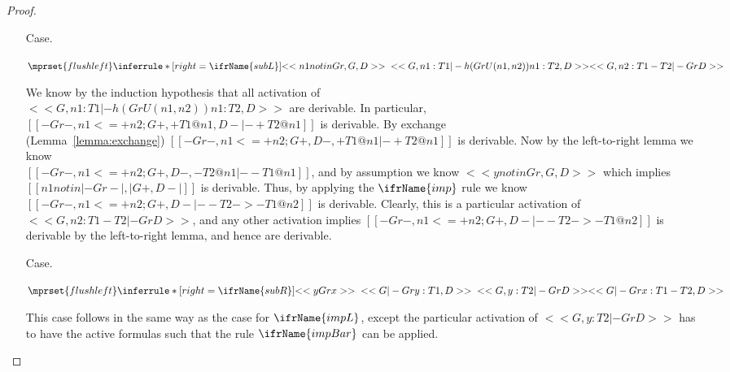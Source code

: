 \begin{proof}
\begin{itemize}
  \item[Case.]\ \\ 
    \begin{center}
      \begin{math}
        $$\mprset{flushleft}
        \inferrule* [right=\ifrName{subL}] {
          <<n1 notin Gr, G, D>>
          \\\\
          <<G, n1 : T1 |- h(Gr U {(n1,n2)}) n1 : T2, D>>
        }{<<G, n2 : T1 - T2 |- Gr D>>}
      \end{math}
    \end{center}
    We know by the induction hypothesis
    that all activation of \\ $<<G, n1 : T1 |- h(Gr U {(n1,n2)}) n1 : T2, D>>$ are derivable.  In particular,
    $[[-Gr-,n1 <=+ n2 ; {G}+, +{T1}@n1,{D}- |- +{T2}@n1]]$ is
    derivable.  By exchange \\ (Lemma~\ref{lemma:exchange})
    $[[-Gr-,n1 <=+ n2 ; {G}+, {D}-,+{T1}@n1 |- +{T2}@n1]]$ is derivable.  Now by the left-to-right lemma we know \\
    $[[-Gr-,n1 <=+ n2 ; {G}+, {D}-,-{T2}@n1 |- -{T1}@n1]]$, and by
    assumption we know $<<y notin Gr, G, D>>$ which implies 
    $[[n1 notin |-Gr-|,|{G}+,{D}-|]]$ is derivable.  Thus, by applying the $\ifrName{imp}$ rule we know  
    $[[-Gr-,n1 <=+ n2 ; {G}+, {D}- |- - {T2} ->- {T1}@n2]]$ is derivable.  Clearly, this is a particular activation of
    $<<G, n2 : T1 - T2 |- Gr D>>$, and any other activation implies
    $[[-Gr-,n1 <=+ n2 ; {G}+, {D}- |- - {T2} ->- {T1}@n2]]$ is derivable by the left-to-right lemma, and hence are derivable.

  \item[Case.]\ \\ 
    \begin{center}
      \begin{math}
        $$\mprset{flushleft}
        \inferrule* [right=\ifrName{subR}] {
          <<y Gr x>>
          \\\\
          <<G |- Gr y : T1 , D>>
          \\\\
          <<G, y : T2 |- Gr D>>
        }{<<G |- Gr x : T1 - T2, D>>}
      \end{math}
    \end{center}
    This case follows in the same way as the case for $\ifrName{impL}$,
    except the particular activation of $<<G, y : T2 |- Gr D>>$ has to have the active formulas such that the
    rule $\ifrName{impBar}$ can be applied.
  \end{itemize}
\end{proof}

